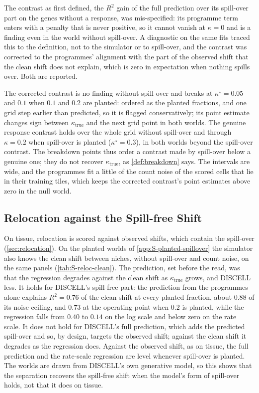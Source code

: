 The contrast as first defined, the $R^2$ gain of the full prediction over its spill-over part on the genes without a response, was mis-specified: its programme term enters with a penalty that is never positive, so it cannot vanish at $\kappa = 0$ and is a finding even in the world without spill-over. A diagnostic on the same fits traced this to the definition, not to the simulator or to spill-over, and the contrast was corrected to the programmes' alignment with the part of the observed shift that the clean shift does not explain, which is zero in expectation when nothing spills over. Both are reported.

The corrected contrast is no finding without spill-over and breaks at $\kappa^\star = 0.05$ and $0.1$ when $0.1$ and $0.2$ are planted: ordered as the planted fractions, and one grid step earlier than predicted, so it is flagged conservatively; its point estimate changes sign between $\kappa_{\text{true}}$ and the next grid point in both worlds. The genuine response contrast holds over the whole grid without spill-over and through $\kappa = 0.2$ when spill-over is planted ($\kappa^\star = 0.3$), in both worlds beyond the spill-over contrast. The breakdown points thus order a contrast made by spill-over below a genuine one; they do not recover $\kappa_{\text{true}}$, as \cref{def:breakdown} says. The intervals are wide, and the programmes fit a little of the count noise of the scored cells that lie in their training tiles, which keeps the corrected contrast's point estimates above zero in the null world.



\subsection{Relocation against the Spill-free Shift}
\label{app:S-reloc-clean}

On tissue, relocation is scored against observed shifts, which contain the spill-over (\cref{sec:relocation}). On the planted worlds of \cref{app:S-planted-spillover} the simulator also knows the clean shift between niches, without spill-over and count noise, on the same panels (\cref{tab:S-reloc-clean}). The prediction, set before the read, was that the regression degrades against the clean shift as $\kappa_{\text{true}}$ grows, and DISCELL less. It holds for DISCELL's spill-free part: the prediction from the programmes alone explains $R^2 = 0.76$ of the clean shift at every planted fraction, about $0.88$ of its noise ceiling, and $0.73$ at the operating point when $0.2$ is planted, while the regression falls from $0.40$ to $0.14$ on the log scale and below zero on the rate scale. It does not hold for DISCELL's full prediction, which adds the predicted spill-over and so, by design, targets the observed shift; against the clean shift it degrades as the regression does. Against the observed shift, as on tissue, the full prediction and the rate-scale regression are level whenever spill-over is planted. The worlds are drawn from DISCELL's own generative model, so this shows that the separation recovers the spill-free shift when the model's form of spill-over holds, not that it does on tissue.

